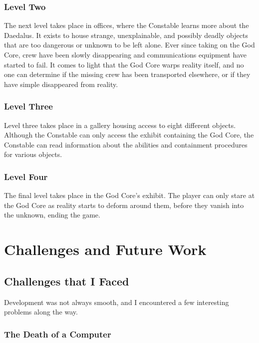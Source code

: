 \documentclass{article}
\begin{document}
\subsubsection{Level Two} \label{subsubsec:leveltwo}

The next level takes place in offices, where the Constable learns more about the Daedalus. It exists to house strange, unexplainable, and possibly deadly objects that are too dangerous or unknown to be left alone. Ever since taking on the God Core, crew have been slowly disappearing and communications equipment have started to fail. It comes to light that the God Core warps reality itself, and no one can determine if the missing crew has been transported elsewhere, or if they have simple disappeared from reality.

\subsubsection{Level Three} \label{subsubsec:levelthree}

Level three takes place in a gallery housing access to eight different objects. Although the Constable can only access the exhibit containing the God Core, the Constable can read information about the abilities and containment procedures for various objects.

\subsubsection{Level Four} \label{subsubsec:four}

The final level takes place in the God Core's exhibit. The player can only stare at the God Core as reality starts to deform around them, before they vanish into the unknown, ending the game.

\section{Challenges and Future Work} \label{sec:problemsandfuture}

\subsection{Challenges that I Faced} \label{subsec:challenges}

Development was not always smooth, and I encountered a few interesting problems along the way.

\subsubsection{The Death of a Computer} \label{subsubsec:death}
\end{document}
